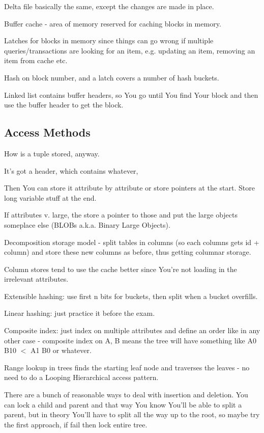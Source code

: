 \documentclass{article}
\begin{document}
		Delta file basically the same, except the changes are made in place.
		
		Buffer cache - area of memory reserved for caching blocks in memory.
		
		Latches for blocks in memory since things can go wrong if multiple queries/transactions are looking for an item, e.g. updating an item, removing an item from cache etc.
		
		Hash on block number, and a latch covers a number of hash buckets.
		
		Linked list contains buffer headers, so You go until You find Your block and then use the buffer header to get the block.
		
	\subsection{Access Methods}
	
		How is a tuple stored, anyway.
		
		It's got a header, which contains whatever, 
		
		Then You can store it attribute by attribute or store pointers at the start. Store long variable stuff at the end.
		
		If attributes v. large, the store a pointer to those and put the large objects someplace else (BLOBs a.k.a. Binary Large Objects).
		
		Decomposition storage model - split tables in columns (so each columns gets id + column) and store these new columns as before, thus getting columnar storage.
		
		Column stores tend to use the cache better since You're not loading in the irrelevant attributes.
		
		Extensible hashing: use first n bits for buckets, then split when a bucket overfills.
		
		Linear hashing: just practice it before the exam.
		
		Composite index: just index on multiple attributes and define an order like in any other case - composite index on A, B means the tree will have something like A0 B10 $<$ A1 B0 or whatever.
		
		Range lookup in trees finds the starting leaf node and traverses the leaves - no need to do a Looping Hierarchical access pattern.
		
		There are a bunch of reasonable ways to deal with insertion and deletion. You can lock a child and parent and that way You know You'll be able to split a parent, but in theory You'll have to split all the way up to the root, so maybe try the first approach, if fail then lock entire tree.
		
\end{document}
